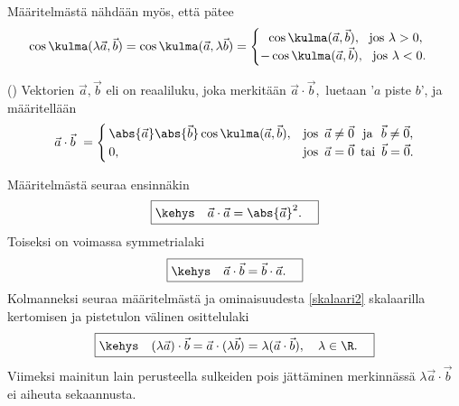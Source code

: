 Määritelmästä nähdään myös, että pätee
\begin{equation} \label{skalaari2}
\cos\kulma(\lambda\vec a,\vec b)=\cos\kulma(\vec a,\lambda\vec b)
                                =\begin{cases}
                                  \ \ \cos\kulma(\vec a,\vec b), \ \ \text{jos}\ \lambda>0, \\
                                     -\cos\kulma(\vec a,\vec b), \ \ \text{jos}\ \lambda<0.
                                 \end{cases}
\end{equation}
\begin{Def} () \label{vektorien skalaaritulo}
 
Vektorien $\vec a, \vec b$  eli  on reaaliluku, joka merkitään
$\vec a \cdot \vec b$, \,luetaan '$a$ piste $b$', ja määritellään
\[
\vec a\cdot\vec b \
                  = \begin{cases} 
                    \,\abs{\vec a} \abs{\vec b}\cos\kulma(\vec a, \vec b), 
                         &\text{jos}\,\ \vec a\neq\vec 0\,\,\ \text{ja}\ \ \vec b\neq\vec 0, \\
                    \,0, &\text{jos}\,\ \vec a = \vec 0\,\ \text{tai}\,\ \vec b = \vec 0.
                    \end{cases}
\]
\end{Def}
Määritelmästä seuraa ensinnäkin
\begin{equation} \label{skalaari3}
\boxed{\kehys\quad \vec a \cdot \vec a = \abs{\vec a}^{2}. \quad}
\end{equation}
Toiseksi on voimassa symmetrialaki
\begin{equation} \label{skalaari4}
\boxed{\kehys\quad \vec a \cdot \vec b = \vec b \cdot \vec a. \quad}
\end{equation}
Kolmanneksi seuraa määritelmästä ja ominaisuudesta \eqref{skalaari2} skalaarilla kertomisen
ja pistetulon välinen osittelulaki
\begin{equation} \label{skalaari5}
\boxed{\kehys\quad (\lambda \vec a) \cdot \vec b 
  = \vec a \cdot (\lambda \vec b) = \lambda ( \vec a \cdot \vec b), \quad \lambda\in\R. \quad}
\end{equation}
Viimeksi mainitun lain perusteella sulkeiden pois jättäminen merkinnässä 
$\lambda \vec a\cdot\vec b$ ei aiheuta sekaannusta. 

